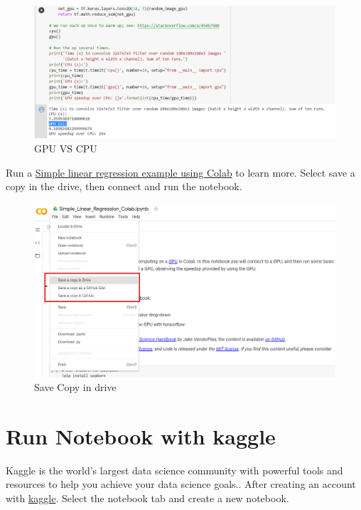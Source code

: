 \documentclass[a4paper,10pt]{article}
\begin{document}
\begin{figure}[H]
\centering
\includegraphics[width=1\columnwidth]{Pictures/Colab_gpu.png}
\caption[Short title]{GPU VS CPU}
\label{fig:ff1}\end{figure}

Run a \href{https://colab.research.google.com/drive/1cTsVAAm4pZqNgPq1A17d1pCWe1i4iIWD?usp=sharing}{Simple linear regression example using Colab} to learn more. Select save a copy in the drive, then connect and run the notebook.

\begin{figure}[H]
\centering
\includegraphics[width=1\columnwidth]{Pictures/Colab_savecopy.png}
\caption[Short title]{Save Copy in drive}
\label{fig:ff1}\end{figure}

\medskip

\newpage

\section{Run Notebook with kaggle}
Kaggle is the world's largest data science community with powerful tools and resources to help you achieve your data science goals.\cite{Kaggle}.
After creating an account with \href{https://www.kaggle.com/}{kaggle}. Select the notebook tab and create a new notebook.
\vspace{5mm}
\end{document}
